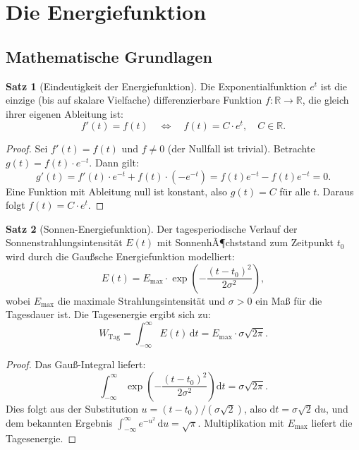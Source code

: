 ﻿\documentclass[a4paper,12pt]{article}
\theoremstyle{definition}
\newtheorem{satz}{Satz}
\begin{document}
\section{Die Energiefunktion}
\label{sec:efunktion}

\subsection{Mathematische Grundlagen}

\begin{satz}[Eindeutigkeit der Energiefunktion]
\label{satz:eindeutigkeit}
    Die Exponentialfunktion $e^t$ ist die einzige (bis auf skalare Vielfache)
    differenzierbare Funktion $f : \mathbb{R} \to \mathbb{R}$, die gleich ihrer
    eigenen Ableitung ist:
    \[
        f'(t) = f(t) \quad \Longleftrightarrow \quad f(t) = C \cdot e^t, \quad C \in \mathbb{R}.
    \]
\end{satz}

\begin{proof}
    Sei $f'(t) = f(t)$ und $f \neq 0$ (der Nullfall ist trivial). Betrachte
    $g(t) = f(t) \cdot e^{-t}$. Dann gilt:
    \[
        g'(t) = f'(t) \cdot e^{-t} + f(t) \cdot (-e^{-t}) = f(t) e^{-t} - f(t) e^{-t} = 0.
    \]
    Eine Funktion mit Ableitung null ist konstant, also $g(t) = C$ f\"ur alle $t$.
    Daraus folgt $f(t) = C \cdot e^t$. \qedhere
\end{proof}

\begin{satz}[Sonnen-Energiefunktion]
\label{satz:sonne}
    Der tagesperiodische Verlauf der Sonnenstrahlungsintensit\"at $E(t)$ mit
    SonnenhÃ¶chststand zum Zeitpunkt $t_0$ wird durch die Gau\ss{}sche Energiefunktion
    modelliert:
    \[
        E(t) = E_{\max} \cdot \exp\!\left(-\frac{(t - t_0)^2}{2\sigma^2}\right),
    \]
    wobei $E_{\max}$ die maximale Strahlungsintensit\"at und $\sigma > 0$ ein
    Ma\ss{} f\"ur die Tagesdauer ist. Die Tagesenergie ergibt sich zu:
    \[
        W_{\mathrm{Tag}} = \int_{-\infty}^{\infty} E(t)\,\mathrm{d}t
        = E_{\max} \cdot \sigma \sqrt{2\pi}.
    \]
\end{satz}

\begin{proof}
    Das Gau\ss{}-Integral liefert:
    \[
        \int_{-\infty}^{\infty} \exp\!\left(-\frac{(t-t_0)^2}{2\sigma^2}\right) \mathrm{d}t
        = \sigma \sqrt{2\pi}.
    \]
    Dies folgt aus der Substitution $u = (t-t_0)/(\sigma\sqrt{2})$, also
    $\mathrm{d}t = \sigma\sqrt{2}\,\mathrm{d}u$, und dem bekannten Ergebnis
    $\int_{-\infty}^{\infty} e^{-u^2}\,\mathrm{d}u = \sqrt{\pi}$. Multiplikation
    mit $E_{\max}$ liefert die Tagesenergie. \qedhere
\end{proof}
\end{document}
